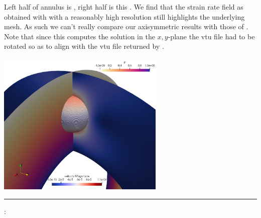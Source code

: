 \begin{center}
{\captionfont Left half of annulus is \aspect, right half is this \stone. 
We find that the strain rate field as obtained with \aspect with a reasonably high 
resolution still highlights the underlying mesh. As such we can't really compare our axisymmetric 
results with those of \aspect. Note that since this \stone computes the solution in the 
$x,y$-plane the vtu file had to be rotated so as to align with the vtu file returned by \aspect.}
\end{center}

\begin{center}
\includegraphics[width=8cm]{python_codes/fieldstone_152/results/exp2_axisymmetric/aspect/sols}
\end{center}





\newpage
\par\noindent\rule{\textwidth}{0.4pt}


\vspace{.5cm}

\noindent\Literature:\\
\\


